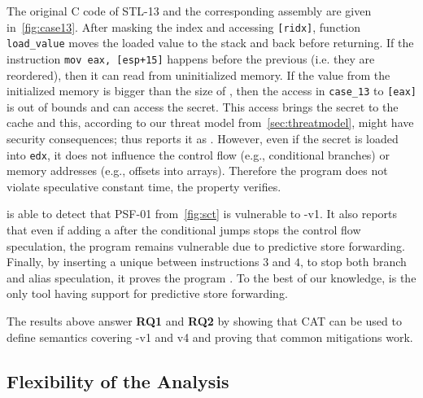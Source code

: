 \documentclass[conference]{IEEEtran}
\begin{document}
The original C code of STL-13 and the corresponding \xes assembly are given in~\autoref{fig:case13}.
After masking the index and accessing \texttt{{\varA}[\texttt{\color{violet}ridx}]}, function \texttt{\color{violet}load\_value} moves the loaded value to the stack and back before returning.
If the instruction \texttt{mov eax, [esp+15]} happens before the previous \store (i.e. they are reordered), then it can read from uninitialized memory.
If the value from the initialized memory is bigger than the size of \varB, then the access in \texttt{\color{violet}case\_13} to \texttt{{\varB}[\texttt{eax}]} is out of bounds and can access the secret.
This access brings the secret to the cache and this, according to our threat model from~\autoref{sec:threatmodel}, might have security consequences; thus \zombmc reports it as \unsafe.
However, even if the secret is loaded into \texttt{edx}, it does not influence the control flow (e.g., conditional branches) or memory addresses (e.g., offsets into arrays).
Therefore the program does not violate speculative constant time, the property \binsec verifies.


\zombmc is able to detect that PSF-01 from~\autoref{fig:sct} is vulnerable to \spectre-v1.
It also reports that even if adding a \fence after the conditional jumps stops the control flow speculation, the program remains vulnerable due to predictive store forwarding.
Finally, by inserting a unique \fence between instructions $3$ and $4$, to stop both branch and alias speculation, it proves the program \safe.
To the best of our knowledge, \zombmc is the only tool having support for predictive store forwarding.

The results above answer {\bfseries RQ1} and {\bfseries RQ2} by showing that CAT can be used to define semantics covering \spectre-v1 and v4 and proving that common mitigations work.

\subsection{Flexibility of the Analysis}
\label{sec:flex}
\end{document}
